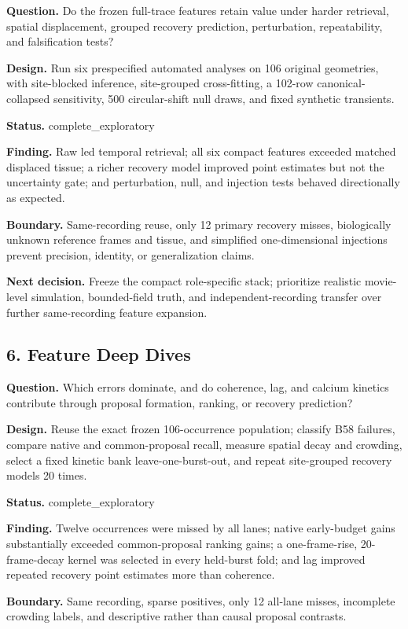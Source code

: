 \textbf{Question.} Do the frozen full-trace features retain value under harder retrieval, spatial displacement, grouped recovery prediction, perturbation, repeatability, and falsification tests?

\textbf{Design.} Run six prespecified automated analyses on 106 original geometries, with site-blocked inference, site-grouped cross-fitting, a 102-row canonical-collapsed sensitivity, 500 circular-shift null draws, and fixed synthetic transients.

\textbf{Status.} complete\_exploratory

\textbf{Finding.} Raw led temporal retrieval; all six compact features exceeded matched displaced tissue; a richer recovery model improved point estimates but not the uncertainty gate; and perturbation, null, and injection tests behaved directionally as expected.

\textbf{Boundary.} Same-recording reuse, only 12 primary recovery misses, biologically unknown reference frames and tissue, and simplified one-dimensional injections prevent precision, identity, or generalization claims.

\textbf{Next decision.} Freeze the compact role-specific stack; prioritize realistic movie-level simulation, bounded-field truth, and independent-recording transfer over further same-recording feature expansion.

\subsection{6. Feature Deep Dives}

\textbf{Question.} Which errors dominate, and do coherence, lag, and calcium kinetics contribute through proposal formation, ranking, or recovery prediction?

\textbf{Design.} Reuse the exact frozen 106-occurrence population; classify B58 failures, compare native and common-proposal recall, measure spatial decay and crowding, select a fixed kinetic bank leave-one-burst-out, and repeat site-grouped recovery models 20 times.

\textbf{Status.} complete\_exploratory

\textbf{Finding.} Twelve occurrences were missed by all lanes; native early-budget gains substantially exceeded common-proposal ranking gains; a one-frame-rise, 20-frame-decay kernel was selected in every held-burst fold; and lag improved repeated recovery point estimates more than coherence.

\textbf{Boundary.} Same recording, sparse positives, only 12 all-lane misses, incomplete crowding labels, and descriptive rather than causal proposal contrasts.

